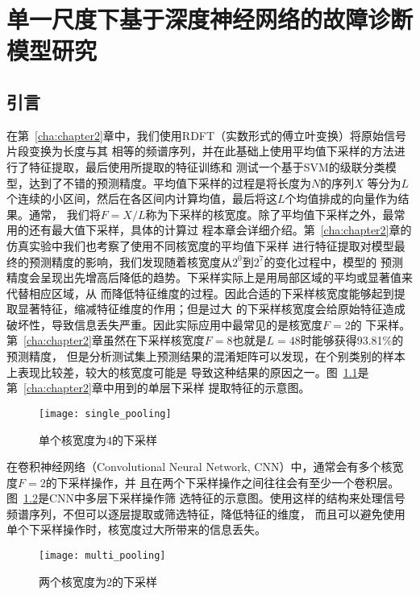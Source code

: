 \chapter{单一尺度下基于深度神经网络的故障诊断模型研究}
\label{cha:chapter3}

\section{引言}

在第~\ref{cha:chapter2}章中，我们使用RDFT（实数形式的傅立叶变换）将原始信号片段变换为长度与其
相等的频谱序列，并在此基础上使用平均值下采样的方法进行了特征提取，最后使用所提取的特征训练和
测试一个基于SVM的级联分类模型，达到了不错的预测精度。平均值下采样的过程是将长度为$N$的序列$X$
等分为$L$个连续的小区间，然后在各区间内计算均值，最后将这$L$个均值排成的向量作为结果。通常，
我们将$F=X/L$称为下采样的核宽度。除了平均值下采样之外，最常用的还有最大值下采样，具体的计算过
程本章会详细介绍。第~\ref{cha:chapter2}章的仿真实验中我们也考察了使用不同核宽度的平均值下采样
进行特征提取对模型最终的预测精度的影响，我们发现随着核宽度从$2^0$到$2^7$的变化过程中，模型的
预测精度会呈现出先增高后降低的趋势。下采样实际上是用局部区域的平均或显著值来代替相应区域，从
而降低特征维度的过程。因此合适的下采样核宽度能够起到提取显著特征，缩减特征维度的作用；但是过大
的下采样核宽度会给原始特征造成破坏性，导致信息丢失严重。因此实际应用中最常见的是核宽度$F=2$的
下采样。第~\ref{cha:chapter2}章虽然在下采样核宽度$F=8$也就是$L=48$时能够获得93.81\%的预测精度，
但是分析测试集上预测结果的混淆矩阵可以发现，在个别类别的样本上表现比较差，较大的核宽度可能是
导致这种结果的原因之一。图~\ref{fig:single_pooling}是第~\ref{cha:chapter2}章中用到的单层下采样
提取特征的示意图。
\begin{figure}[ht]
  \centering%
  \texttt{[image: single\_pooling]}
  \caption{单个核宽度为4的下采样}
  \label{fig:single_pooling}
\end{figure}

在卷积神经网络（Convolutional Neural Network, CNN）中，通常会有多个核宽度$F=2$的下采样操作，并
且在两个下采样操作之间往往会有至少一个卷积层。图~\ref{fig:multi_pooling}是CNN中多层下采样操作筛
选特征的示意图。使用这样的结构来处理信号频谱序列，不但可以逐层提取或筛选特征，降低特征的维度，
而且可以避免使用单个下采样操作时，核宽度过大所带来的信息丢失。
\begin{figure}[ht]
  \centering%
  \texttt{[image: multi\_pooling]}
  \caption{两个核宽度为2的下采样}
  \label{fig:multi_pooling}
\end{figure}

